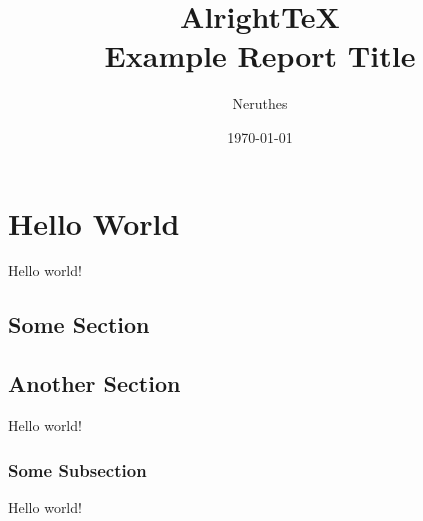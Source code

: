 \documentclass[11pt,a4paper]{report}
\title{AlrightTeX\\Example Report Title}
\author{Neruthes}
\date{\today}
\begin{document}
\maketitlecover

\tableofcontents


\chapter{Hello World}
Hello world!

\section{Some Section}
\lipsum[1-3][1-5]

\section{Another Section}
Hello world!

\lipsum[1-3][1-5]

\subsection{Some Subsection}
Hello world!

\lipsum[1-3][1-5]
\end{document}
